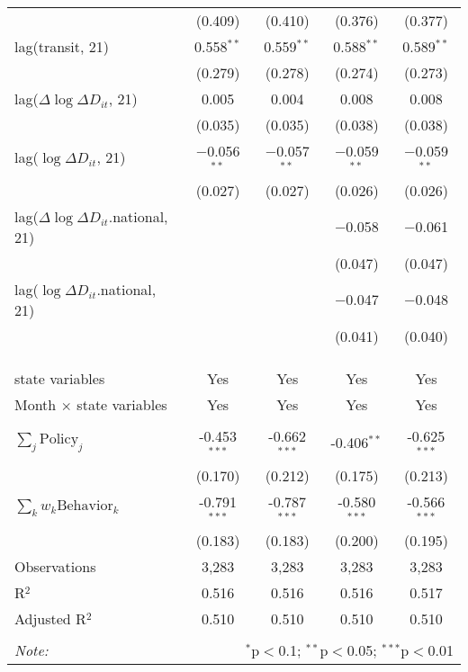 \begin{tabular}{@{\extracolsep{1pt}}lcccc}
  & (0.409) & (0.410) & (0.376) & (0.377) \\ 
  lag(transit, 21) & 0.558$^{**}$ & 0.559$^{**}$ & 0.588$^{**}$ & 0.589$^{**}$ \\ 
  & (0.279) & (0.278) & (0.274) & (0.273) \\ 
  lag($\Delta \log \Delta D_{it}$, 21) & 0.005 & 0.004 & 0.008 & 0.008 \\ 
  & (0.035) & (0.035) & (0.038) & (0.038) \\ 
  lag($\log \Delta D_{it}$, 21) & $-$0.056$^{**}$ & $-$0.057$^{**}$ & $-$0.059$^{**}$ & $-$0.059$^{**}$ \\ 
  & (0.027) & (0.027) & (0.026) & (0.026) \\ 
  lag($\Delta \log \Delta D_{it}$.national, 21) &  &  & $-$0.058 & $-$0.061 \\ 
  &  &  & (0.047) & (0.047) \\ 
  lag($\log \Delta D_{it}$.national, 21) &  &  & $-$0.047 & $-$0.048 \\ 
  &  &  & (0.041) & (0.040) \\ 
   &  &  &  &  \\ 
  &  &  &  &  \\ 
 \hline \\[-1.8ex] 
state variables & Yes & Yes & Yes & Yes \\ 
Month $\times$ state variables & Yes & Yes & Yes & Yes \\ 
\hline \\[-1.8ex] 
$\sum_j \mathrm{Policy}_j$ & -0.453$^{***}$ & -0.662$^{***}$ & -0.406$^{**}$ & -0.625$^{***}$ \\ 
 & (0.170) & (0.212) & (0.175) & (0.213) \\ 
$\sum_k w_k \mathrm{Behavior}_k$ & -0.791$^{***}$ & -0.787$^{***}$ & -0.580$^{***}$ & -0.566$^{***}$ \\ 
 & (0.183) & (0.183) & (0.200) & (0.195) \\ 
Observations & 3,283 & 3,283 & 3,283 & 3,283 \\ 
R$^{2}$ & 0.516 & 0.516 & 0.516 & 0.517 \\ 
Adjusted R$^{2}$ & 0.510 & 0.510 & 0.510 & 0.510 \\ 
\hline 
\hline \\[-1.8ex] 
\textit{Note:}  & \multicolumn{4}{r}{$^{*}$p$<$0.1; $^{**}$p$<$0.05; $^{***}$p$<$0.01} \\ 
\end{tabular} 